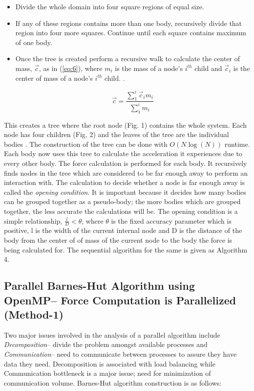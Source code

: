 \documentclass[letterpaper, 10 pt, conference]{ieeeconf}
\begin{document}
    \begin{itemize}
        \item Divide the whole domain into four square regions of equal size.
        \item If any of these regions contains more than one body, recursively divide that region into four more squares. Continue until each square contains maximum of one body.
        \item Once the tree is created perform a recursive walk to calculate the center of mass, $\vec{c}$, as in (\ref{eq:6}), where $m_i$ is the mass of a node\'{}s $i^{th}$ child and $\vec{c}_i$ is the center of mass of a node\'{}s $i^{th}$ child.
        .

        \begin{equation}
            \label{eq:6}
            \vec{c} = \frac{\sum_{1}^i\vec{c}_im_i}{\sum_{1}^im_i}
        \end{equation}
    \end{itemize}


    This creates a tree where the root node (Fig. 1) contains the whole system. Each node has four children (Fig. 2) and the leaves of the tree are the individual bodies \cite{c9}. The construction of the tree can be done with  \(O(N\log(N))\) runtime. Each body now uses this tree to calculate the acceleration it experiences due to every other body. The force calculation is performed for each body. It recursively finds nodes in the tree which are considered to be far enough away to perform an interaction with. The calculation to decide whether a node is far enough away is called the \textit{opening condition}. It is important because it decides how many bodies can be grouped together as a pseudo-body; the more bodies which are grouped together, the less accurate the calculations will be. The opening condition is a simple relationship, \(\frac{l}{D} < \theta\), where \(\theta\) is the fixed accuracy parameter which is positive, l is the width of the current internal node and D is the distance of the body from the center of of mass of the current node to the body the force is being calculated for. The sequential algorithm for the same is given as Algorithm 4.

    \subsection{Parallel Barnes-Hut Algorithm using OpenMP{--} Force Computation is Parallelized (Method-1)}

    Two major issues involved in the analysis of a parallel algorithm include \textit{Decomposition}{--} divide the problem amongst available processes and \textit{Communication}{--} need to communicate between processes to assure they have data they need. Decomposition is associated with load balancing while Communication bottleneck is a major issue; need for minimization of communication volume. Barnes-Hut algorithm construction is as follows:
\end{document}
